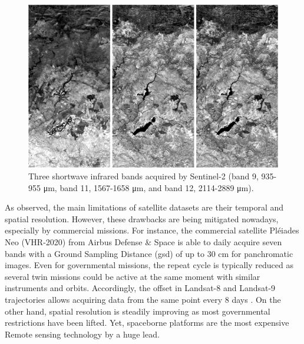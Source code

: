 \begin{figure}[!ht]
	\includegraphics{figs/introduction/sentinel2_bands.png}
	\caption{Three shortwave infrared bands acquired by Sentinel-2 (band 9, 935-955 \si{\micro\meter}, band 11, 1567-1658 \si{\micro\meter}, and band 12, 2114-2889 \si{\micro\meter}). }
    \label{fig:sentinel2}
\end{figure}

As observed, the main limitations of satellite datasets are their temporal and spatial resolution. However, these drawbacks are being mitigated nowadays, especially by commercial missions. For instance, the commercial satellite Pléiades Neo (VHR-2020) from Airbus Defense \& Space \cite{airbus_pleiades_2021} is able to daily acquire seven bands with a Ground Sampling Distance (\acrshort{gsd}) of up to 30 \si{\centi\meter} for panchromatic images. Even for governmental missions, the repeat cycle is typically reduced as several twin missions could be active at the same moment with similar instruments and orbits. Accordingly, the offset in Landsat-8 and Landsat-9 trajectories allows acquiring data from the same point every 8 days \cite{masek_landsat_2020}. On the other hand, spatial resolution is steadily improving as most governmental restrictions have been lifted. Yet, spaceborne platforms are the most expensive Remote sensing technology by a huge lead. 

